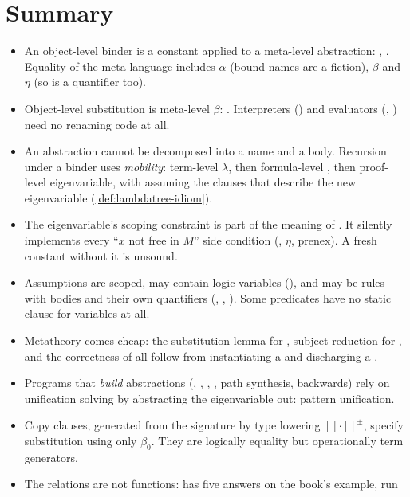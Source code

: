 {{{{{{\section{Summary}\label{sec:lambdatree-summary}
\begin{itemize}
  \item An object-level binder is a constant applied to a meta-level abstraction: ,
        . Equality of the meta-language includes $\alpha$ (bound names are a fiction), $\beta$ and
        $\eta$ (so  is a quantifier too).
  \item Object-level substitution is meta-level $\beta$: . Interpreters () and evaluators
        (, ) need no renaming code at all.
  \item An abstraction cannot be decomposed into a name and a body. Recursion under a binder uses
        \emph{mobility}: term-level $\lambda$, then formula-level , then proof-level eigenvariable, with
        \lp{=>} assuming the clauses that describe the new eigenvariable (\cref{def:lambdatree-idiom}).
  \item The eigenvariable's scoping constraint is part of the meaning of . It silently implements every
        \enquote{$x$ not free in $M$} side condition (, $\eta$, prenex). A fresh constant without it is
        unsound.
  \item Assumptions are scoped, may contain logic variables (), and may be rules with bodies and
        their own quantifiers (, , ). Some predicates have no static clause for
        variables at all.
  \item Metatheory comes cheap: the substitution lemma for , subject reduction for , and the
        correctness of  all follow from instantiating a  and discharging a \lp{=>}.
  \item Programs that \emph{build} abstractions (, , , , path synthesis,
         backwards) rely on unification solving  by abstracting the eigenvariable out:
        pattern unification.
  \item Copy clauses, generated from the signature by type lowering $[\![\cdot]\!]^{\pm}$, specify substitution
        using only $\beta_0$. They are logically equality but operationally term generators.
  \item The relations are not functions:  has five answers on the book's example,  run

\end{itemize}}}}}}}
